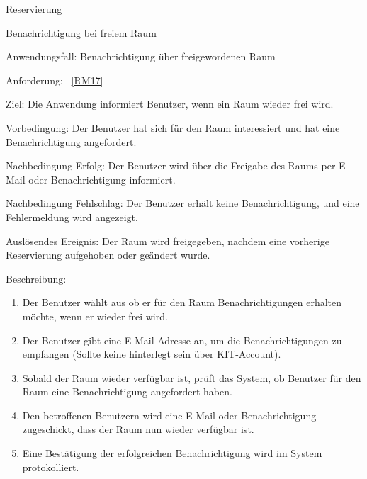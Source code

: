 \begin{function}{20}{Reservierung}
\begin{function}{60}{Benachrichtigung bei freiem Raum}
    \item[Anwendungsfall:] Benachrichtigung über freigewordenen Raum
    \item[Anforderung:] ~\ref{RM17}
    \item[Ziel:] Die Anwendung informiert Benutzer, wenn ein Raum wieder frei wird.
    \item[Vorbedingung:] Der Benutzer hat sich für den Raum interessiert und hat eine Benachrichtigung angefordert.
    \item[Nachbedingung Erfolg:] Der Benutzer wird über die Freigabe des Raums per E-Mail oder Benachrichtigung informiert.
    \item[Nachbedingung Fehlschlag:] Der Benutzer erhält keine Benachrichtigung, und eine Fehlermeldung wird angezeigt.
    \item[Auslösendes Ereignis:] Der Raum wird freigegeben, nachdem eine vorherige Reservierung aufgehoben oder geändert wurde.
    \item[Beschreibung:] ~
    \begin{enumerate}
        \item Der Benutzer wählt aus ob er für den Raum Benachrichtigungen erhalten möchte, wenn er wieder frei wird.
        \item Der Benutzer gibt eine E-Mail-Adresse an, um die Benachrichtigungen zu empfangen (Sollte keine hinterlegt sein über KIT-Account).
        \item Sobald der Raum wieder verfügbar ist, prüft das System, ob Benutzer für den Raum eine Benachrichtigung angefordert haben.
        \item Den betroffenen Benutzern wird eine E-Mail oder Benachrichtigung zugeschickt, dass der Raum nun wieder verfügbar ist.
        \item Eine Bestätigung der erfolgreichen Benachrichtigung wird im System protokolliert.
    \end{enumerate}
\end{function}


\end{function}
